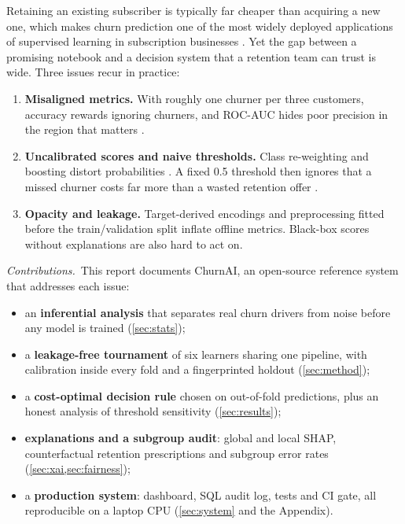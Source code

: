 \documentclass[conference]{IEEEtran}
\newcommand{\para}[1]{\par\textit{#1.}\ }%
\begin{document}
Retaining an existing subscriber is typically far cheaper than acquiring a new one, which makes
churn prediction one of the most widely deployed applications of supervised learning in
subscription businesses \cite{neslin2006defection,verbeke2012new}. Yet the gap between a
promising notebook and a decision system that a retention team can trust is wide. Three issues
recur in practice:
\begin{enumerate}
  \item \textbf{Misaligned metrics.} With roughly one churner per three customers, accuracy
  rewards ignoring churners, and ROC-AUC hides poor precision in the region that matters
  \cite{saito2015precision,davis2006relationship}.
  \item \textbf{Uncalibrated scores and naive thresholds.} Class re-weighting and boosting
  distort probabilities \cite{niculescu2005predicting}. A fixed 0.5 threshold then ignores that a
  missed churner costs far more than a wasted retention offer \cite{elkan2001foundations}.
  \item \textbf{Opacity and leakage.} Target-derived encodings and preprocessing fitted
  before the train/validation split inflate offline metrics. Black-box scores without
  explanations are also hard to act on.
\end{enumerate}

\para{Contributions}This report documents ChurnAI, an open-source reference system
that addresses each issue:
\begin{itemize}
  \item an \textbf{inferential analysis} that separates real churn drivers from noise before
        any model is trained (\cref{sec:stats});
  \item a \textbf{leakage-free tournament} of six learners sharing one pipeline, with
        calibration inside every fold and a fingerprinted holdout (\cref{sec:method});
  \item a \textbf{cost-optimal decision rule} chosen on out-of-fold predictions, plus an
        honest analysis of threshold sensitivity (\cref{sec:results});
  \item \textbf{explanations and a subgroup audit}: global and local SHAP, counterfactual
        retention prescriptions and subgroup error rates (\cref{sec:xai,sec:fairness});
  \item a \textbf{production system}: dashboard, SQL audit log, tests and CI gate, all
        reproducible on a laptop CPU (\cref{sec:system} and the Appendix).
\end{itemize}
\end{document}
